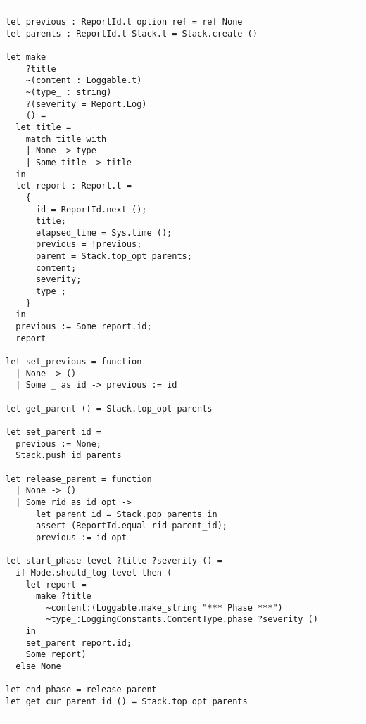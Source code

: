 \vspace{2em}
\noindent\rule{\textwidth}{0.5pt}
\vspace{-0.6cm}
\begin{verbatim}
let previous : ReportId.t option ref = ref None
let parents : ReportId.t Stack.t = Stack.create ()

let make
    ?title
    ~(content : Loggable.t)
    ~(type_ : string)
    ?(severity = Report.Log)
    () =
  let title =
    match title with
    | None -> type_
    | Some title -> title
  in
  let report : Report.t =
    {
      id = ReportId.next ();
      title;
      elapsed_time = Sys.time ();
      previous = !previous;
      parent = Stack.top_opt parents;
      content;
      severity;
      type_;
    }
  in
  previous := Some report.id;
  report

let set_previous = function
  | None -> ()
  | Some _ as id -> previous := id

let get_parent () = Stack.top_opt parents

let set_parent id =
  previous := None;
  Stack.push id parents

let release_parent = function
  | None -> ()
  | Some rid as id_opt ->
      let parent_id = Stack.pop parents in
      assert (ReportId.equal rid parent_id);
      previous := id_opt

let start_phase level ?title ?severity () =
  if Mode.should_log level then (
    let report =
      make ?title
        ~content:(Loggable.make_string "*** Phase ***")
        ~type_:LoggingConstants.ContentType.phase ?severity ()
    in
    set_parent report.id;
    Some report)
  else None

let end_phase = release_parent
let get_cur_parent_id () = Stack.top_opt parents
\end{verbatim}
\vspace{-0.4cm}
\noindent\rule{\textwidth}{0.5pt}
\vspace{-0.6cm}
\label{lst:reportbuilder}

